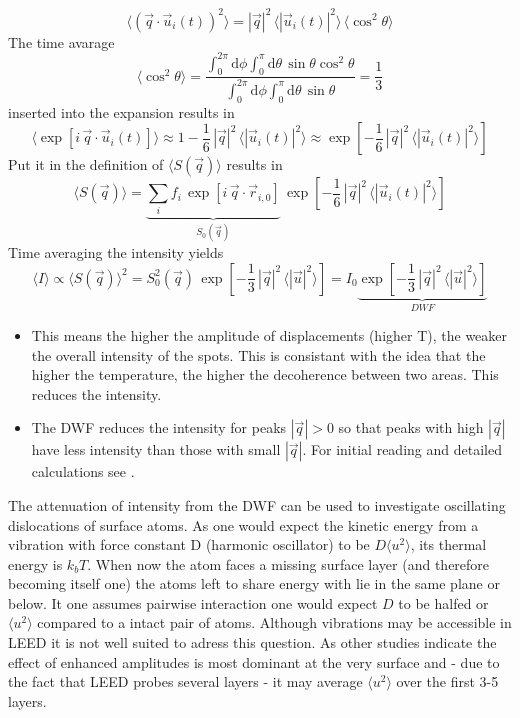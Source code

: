 $$\langle \left(\vec{q}\cdot\vec{u}_{i}(t)\right)^2 \rangle=|\vec{q}|^{2}\,\langle|\vec{u}_{i}(t)|^2\rangle \,\langle\cos^{2}\theta\rangle$$ The time avarage 
$$ \langle \cos^{2}\theta \rangle=\frac{\int_{0}^{2\pi}\mathrm{d}\phi\int_{0}^{\pi}\mathrm{d}\theta\,\sin\theta\cos^{2}\theta}{\int_{0}^{2\pi}\mathrm{d}\phi\int_{0}^{\pi}\mathrm{d}\theta\,\sin\theta}=\frac{1}{3} $$ inserted into the expansion results in
$$\langle \exp\left[i\,\vec{q}\cdot\vec{u}_{i}(t)\right]\rangle \approx1-\frac{1}{6}\,|\vec{q}|^{2}\,\langle|\vec{u}_{i}(t)|^2\rangle \approx \exp\left[-\frac{1}{6}\,|\vec{q}|^{2}\,\langle|\vec{u}_{i}(t)|^2\rangle \right]$$
Put it in the definition of $\langle S(\vec q) \rangle$ results in
$$\langle S(\vec q) \rangle =\underbrace{\sum_i f_{i}\,\exp\left[i\,\vec{q}\cdot\vec{r}_{i,0}\right]}_{S_0(\vec q)}\,\exp\left[-\frac{1}{6}\,|\vec{q}|^{2}\,\langle|\vec{u}_{i}(t)|^2 \rangle \right]$$
Time averaging the intensity yields $$\langle I \rangle \propto \langle S(\vec q)\rangle^2 =S_0^2(\vec q)\,\exp\left[-\frac{1}{3}\,|\vec{q}|^{2}\,\langle|\vec{u}|^2\rangle \right]=I_{0}\underbrace{\exp\left[-\frac{1}{3}\,|\vec{q}|^{2}\,\langle|\vec{u}|^2\rangle \right]}_{DWF}$$
\begin{itemize}
 \item This means the higher the amplitude of displacements (higher T), the weaker the overall intensity of the spots. This is consistant with the idea that the higher the temperature, the higher the decoherence between two areas. This reduces the intensity.
 \item The DWF reduces the intensity for peaks $|\vec q|>0$ so that peaks with high $|\vec q|$ have less intensity than those with small $|\vec q|$. For initial reading and detailed calculations see \cite{debye_interferenz_1913}.
\end{itemize}
The attenuation of intensity from the DWF can be used to investigate oscillating dislocations of surface atoms. As one would expect the kinetic energy from a vibration with force constant D (harmonic oscillator) to be $D\langle u^2\rangle$, its thermal energy is $k_bT$. When now the atom faces a missing surface layer (and therefore becoming itself one) the atoms left to share energy with lie in the same plane or below. It one assumes pairwise interaction one would expect $D$ to be halfed or $\langle u^2 \rangle$ compared to a intact pair of atoms\cite[69]{woodruff_modern_1986}. Although vibrations may be accessible in LEED it is not well suited to adress this question. As other studies indicate the effect of enhanced amplitudes is most dominant at the very surface and - due to the fact that LEED probes several layers - it may average $\langle u^2 \rangle$ over the first 3-5 layers.


